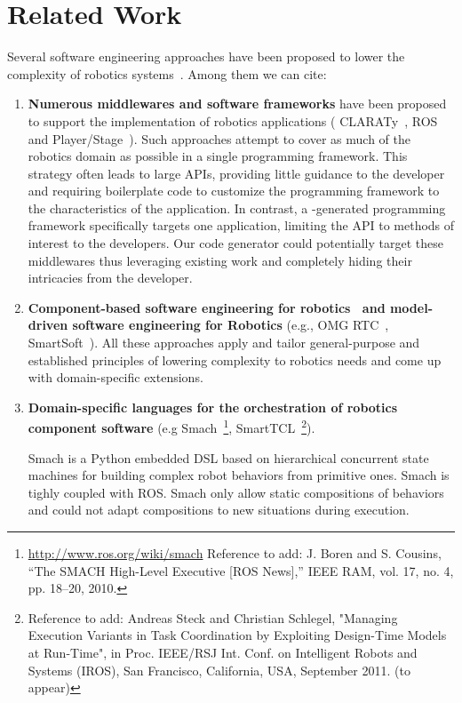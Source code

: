 
\section{Related Work}
\label{sec:related}

Several software engineering approaches have been proposed to lower
the complexity of robotics systems~\cite{Brug07a}. Among them we can cite:

\begin{enumerate}
\item {\bf Numerous middlewares and software frameworks} have been proposed to
support the implementation of robotics applications (\eg{}
CLARATy~\cite{Claraty}, ROS~\cite{ROS} and Player/Stage~\cite{Coll05a}).
Such approaches attempt to cover as much of the robotics domain as
possible in a single programming framework. This strategy often leads
to large APIs, providing little guidance to the developer and
requiring boilerplate code to customize the programming framework to
the characteristics of the application. In contrast, a
\diaspec{}-generated programming framework specifically targets one
application, limiting the API to methods of interest to the
developers. Our code generator could potentially target these
middlewares thus leveraging existing work and completely hiding their
intricacies from the developer.

\item {\bf Component-based software engineering for robotics~\cite{Brug07b} and
model-driven software engineering for Robotics} (e.g., OMG
RTC~\cite{OMGRTC}, SmartSoft~\cite{Schl09a}). All these approaches
apply and tailor general-purpose and established principles of
lowering complexity to robotics needs and come up with domain-specific
extensions.

\item {\bf Domain-specific languages for the orchestration of robotics component software} (e.g Smach~\footnote{\url{http://www.ros.org/wiki/smach} Reference to add: J. Boren and S. Cousins, “The SMACH High-Level Executive [ROS News],” IEEE RAM, vol. 17, no. 4, pp. 18–20, 2010. }, SmartTCL~\footnote{Reference to add: Andreas Steck and Christian Schlegel, "Managing Execution Variants in Task Coordination by Exploiting Design-Time Models at Run-Time", in Proc. IEEE/RSJ Int. Conf. on Intelligent Robots and Systems (IROS), San Francisco, California, USA, September 2011. (to appear)}).

Smach is a Python embedded DSL based on hierarchical concurrent state machines for building complex robot behaviors from primitive ones. Smach is tighly coupled with ROS. Smach only allow static compositions of behaviors and could not adapt compositions to new situations during execution.


\end{enumerate}
